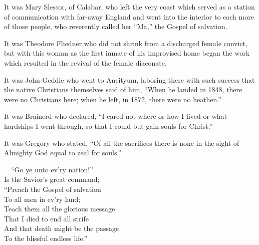\documentclass[
]{book}
\begin{document}
It was Mary Slessor, of Calabar, who left the very coast which served as a station of communication with far-away England and went into the interior to each more of those people, who reverently called her ``Ma,'' the Gospel of salvation.

It was Theodore Fliedner who did not shrink from a discharged female convict, but with this woman as the first inmate of his improvised home began the work which resulted in the revival of the female diaconate.

It was John Geddie who went to Aneityum, laboring there with such success that the native Christians themselves said of him, ``When he landed in 1848, there were no Christians here; when he left, in 1872, there were no heathen.''

It was Brainerd who declared, ``I cared not where or how I lived or what hardships I went through, so that I could but gain souls for Christ.''

It was Gregory who stated, ``Of all the sacrifices there is none in the sight of Almighty God equal to zeal for souls.''

~~``Go ye unto ev'ry nation!''\\
\hspace*{0.333em}\hspace*{0.333em}Is the Savior's great command;\\
\hspace*{0.333em}\hspace*{0.333em}``Preach the Gospel of salvation\\
\hspace*{0.333em}\hspace*{0.333em}To all men in ev'ry land;\\
\hspace*{0.333em}\hspace*{0.333em}Teach them all the glorious message\\
\hspace*{0.333em}\hspace*{0.333em}That I died to end all strife\\
\hspace*{0.333em}\hspace*{0.333em}And that death might be the passage\\
\hspace*{0.333em}\hspace*{0.333em}To the blissful endless life.''
\end{document}
